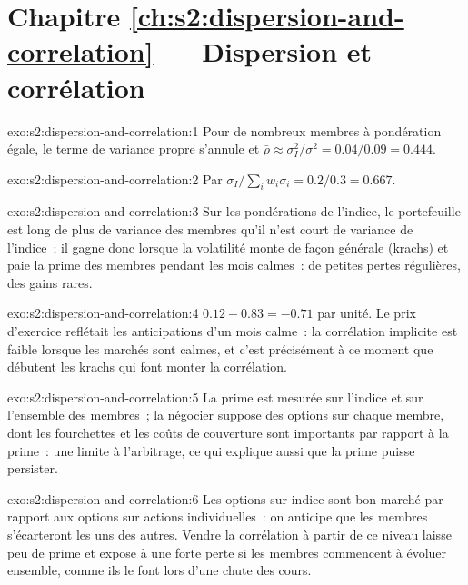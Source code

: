 \section*{Chapitre \ref{ch:s2:dispersion-and-correlation} --- Dispersion et corrélation}

\begin{solution}{exo:s2:dispersion-and-correlation:1}
Pour de nombreux membres à pondération égale, le terme de variance propre s'annule et $\bar\rho \approx \sigma_I^2/\sigma^2 = 0.04/0.09 = 0.444$.
\end{solution}

\begin{solution}{exo:s2:dispersion-and-correlation:2}
Par $\sigma_I/\sum_i w_i\sigma_i = 0.2/0.3 = 0.667$.
\end{solution}

\begin{solution}{exo:s2:dispersion-and-correlation:3}
Sur les pondérations de l'indice, le portefeuille est long de plus de variance des membres qu'il n'est court de variance de l'indice~; il gagne donc lorsque la volatilité monte de façon générale (krachs) et paie
la prime des membres pendant les mois calmes~: de petites pertes régulières, des gains rares.
\end{solution}

\begin{solution}{exo:s2:dispersion-and-correlation:4}
$0.12 - 0.83 = -0.71$ par unité. Le prix d'exercice reflétait les anticipations d'un mois calme~: la corrélation implicite est faible lorsque les marchés sont calmes, et c'est précisément à ce moment que
débutent les krachs qui font monter la corrélation.
\end{solution}

\begin{solution}{exo:s2:dispersion-and-correlation:5}
La prime est mesurée sur l'indice et sur l'ensemble des membres~; la négocier suppose des options sur chaque membre, dont les fourchettes et les coûts de couverture sont importants par rapport à
la prime~: une limite à l'arbitrage, ce qui explique aussi que la prime puisse persister.
\end{solution}

\begin{solution}{exo:s2:dispersion-and-correlation:6}
Les options sur indice sont bon marché par rapport aux options sur actions individuelles~: on anticipe que les membres s'écarteront les uns des autres. Vendre la corrélation à partir de ce niveau laisse peu de prime et
expose à une forte perte si les membres commencent à évoluer ensemble, comme ils le font lors d'une chute des cours.
\end{solution}


